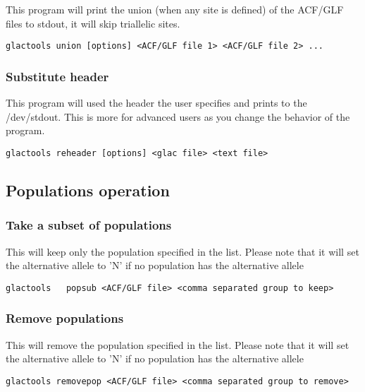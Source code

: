 \documentclass[a4paper]{article}
\begin{document}
\noindent This program will print the union (when any site is defined) of the ACF/GLF files to stdout, it will skip triallelic sites.

\begin{lstlisting}
glactools union [options] <ACF/GLF file 1> <ACF/GLF file 2> ...
\end{lstlisting}


\subsubsection{Substitute header}
\noindent This program will used the header the user specifies and prints to the /dev/stdout. This is more for advanced users as you change the behavior of the program.

\begin{lstlisting}
glactools reheader [options] <glac file> <text file>
\end{lstlisting}



\subsection{Populations operation}

\subsubsection{Take a subset of populations}

\noindent This will keep only the population specified in the list. Please note that it will set the alternative allele to 'N' if no population has the alternative allele

\begin{lstlisting}
glactools   popsub <ACF/GLF file> <comma separated group to keep>
\end{lstlisting}

\subsubsection{Remove populations}

\noindent This will remove the population specified in the list. Please note that it will set the alternative allele to 'N' if no population has the alternative allele

\begin{lstlisting}
glactools removepop <ACF/GLF file> <comma separated group to remove>
\end{lstlisting}
\end{document}
